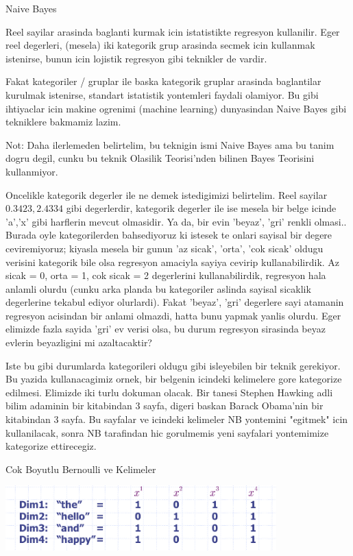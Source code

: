 \documentclass[12pt,fleqn]{article}\usepackage{../common}
\begin{document}
Naive Bayes

Reel sayilar arasinda baglanti kurmak icin istatistikte regresyon
kullanilir. Eger reel degerleri, (mesela) iki kategorik grup arasinda secmek
icin kullanmak istenirse, bunun icin lojistik regresyon gibi teknikler de
vardir.

Fakat kategoriler / gruplar ile baska kategorik gruplar arasinda
baglantilar kurulmak istenirse, standart istatistik yontemleri faydali
olamiyor. Bu gibi ihtiyaclar icin makine ogrenimi (machine learning)
dunyasindan Naive Bayes gibi tekniklere bakmamiz lazim.

Not: Daha ilerlemeden belirtelim, bu teknigin ismi Naive Bayes ama bu tanim
dogru degil, cunku bu teknik Olasilik Teorisi'nden bilinen Bayes Teorisini
kullanmiyor.

Oncelikle kategorik degerler ile ne demek istedigimizi belirtelim. Reel
sayilar $0.3423, 2.4334$ gibi degerlerdir, kategorik degerler ile ise
mesela bir belge icinde 'a','x' gibi harflerin mevcut olmasidir. Ya da, bir
evin 'beyaz', 'gri' renkli olmasi.. Burada oyle kategorilerden bahsediyoruz
ki istesek te onlari sayisal bir degere ceviremiyoruz; kiyasla mesela bir
gunun 'az sicak', 'orta', 'cok sicak' oldugu verisini kategorik bile olsa
regresyon amaciyla sayiya cevirip kullanabilirdik. Az sicak = 0, orta = 1,
cok sicak = 2 degerlerini kullanabilirdik, regresyon hala anlamli olurdu
(cunku arka planda bu kategoriler aslinda sayisal sicaklik degerlerine
tekabul ediyor olurlardi). Fakat 'beyaz', 'gri' degerlere sayi atamanin
regresyon acisindan bir anlami olmazdi, hatta bunu yapmak yanlis
olurdu. Eger elimizde fazla sayida 'gri' ev verisi olsa, bu durum regresyon
sirasinda beyaz evlerin beyazligini mi azaltacaktir?

Iste bu gibi durumlarda kategorileri oldugu gibi isleyebilen bir teknik
gerekiyor. Bu yazida kullanacagimiz ornek, bir belgenin icindeki kelimelere
gore kategorize edilmesi. Elimizde iki turlu dokuman olacak. Bir tanesi
Stephen Hawking adli bilim adaminin bir kitabindan 3 sayfa, digeri baskan
Barack Obama'nin bir kitabindan 3 sayfa. Bu sayfalar ve icindeki kelimeler
NB yontemini "egitmek" icin kullanilacak, sonra NB tarafindan hic
gorulmemis yeni sayfalari yontemimize kategorize ettirecegiz.

Cok Boyutlu Bernoulli ve Kelimeler

\includegraphics[height=2.5cm]{dims.png}
\end{document}
